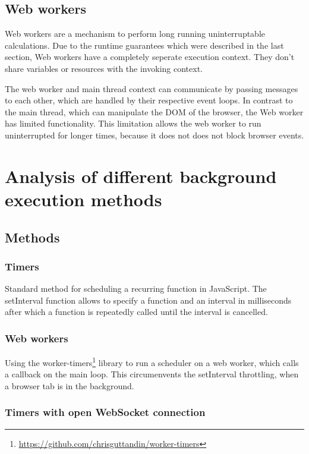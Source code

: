 \documentclass[article,type=bsc,colorback,accentcolor=tud9c]{tudthesis}
\begin{document}
  
  \subsection{Web workers}

  Web workers are a mechanism to perform long running uninterruptable calculations. Due to the runtime guarantees which were described in the last section, Web workers have a completely seperate execution context. They don't share variables or resources with the invoking context.

  The web worker and main thread context can communicate by passing messages to each other, which are handled by their respective event loops. In contrast to the main thread, which can manipulate the DOM of the browser, the Web worker has limited functionality. This limitation allows the web worker to run uninterrupted for longer times, because it does not does not block browser events.

  \newpage
  \section{Analysis of different background execution methods}

  \subsection{Methods}

  
  \subsubsection{Timers}

  Standard method for scheduling a recurring function in JavaScript. The setInterval function allows to specify a function and an interval in milliseconds after which a function is repeatedly called until the interval is cancelled.
  
  \subsubsection{Web workers}
  
  Using the worker-timers\footnote{\url{https://github.com/chrisguttandin/worker-timers}} library to run a scheduler on a web worker, which calls a callback on the main loop. This circumenvents the setInterval throttling, when a browser tab is in the background.

  \subsubsection{Timers with open WebSocket connection}
\end{document}
